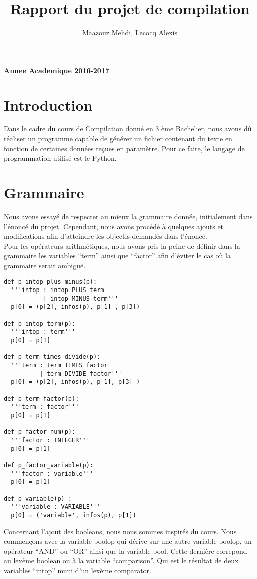 \documentclass[a4paper,10pt]{article}
\title{Rapport du projet de compilation}
\author{Maazouz Mehdi, Lecocq Alexis}
\begin{document}
\maketitle
\textbf{Annee Academique 2016-2017}\\
\tableofcontents
\newpage

\section{Introduction}
Dans le cadre du cours de Compilation donné en 3 ème Bachelier, nous avons dû réaliser un programme
capable de générer un fichier contenant du texte en fonction de certaines données reçues en paramètre.
Pour ce faire, le langage de programmation utilisé est le Python.
\section{Grammaire}
Nous avons essayé de respecter au mieux la grammaire donnée, initialement dans l'énoncé du projet.
Cependant, nous avons procédé à quelques ajouts et modifications afin d'atteindre les objectis demandés dans 
l'énoncé.\\
Pour les opérateurs arithmétiques, nous avons pris la peine de définir dans la grammaire les variables ``term'' ainsi que ``factor'' afin d'éviter
le cas où la grammaire serait ambiguë.\\
\begin{lstlisting}
def p_intop_plus_minus(p):
  '''intop : intop PLUS term
           | intop MINUS term'''
  p[0] = (p[2], infos(p), p[1] , p[3])

def p_intop_term(p):
  '''intop : term'''
  p[0] = p[1]

def p_term_times_divide(p):
  '''term : term TIMES factor
          | term DIVIDE factor'''
  p[0] = (p[2], infos(p), p[1], p[3] )

def p_term_factor(p):
  '''term : factor'''
  p[0] = p[1]

def p_factor_num(p):
  '''factor : INTEGER'''
  p[0] = p[1]

def p_factor_variable(p):
  '''factor : variable'''
  p[0] = p[1]

def p_variable(p) :
  '''variable : VARIABLE'''
  p[0] = ('variable', infos(p), p[1])

\end{lstlisting}
\newpage
Concernant l'ajout des booleans, nous nous sommes inspirés du cours. Nous commençons avec la variable boolop qui dérive sur une autre variable
boolop, un opérateur ``AND'' ou ``OR'' ainsi que la variable bool. Cette dernière correpond au lexème boolean ou à la variable ``comparison''.
Qui est le résultat de deux variables ``intop'' muni d'un lexème comparator.
\end{document}
